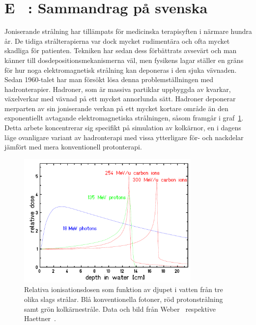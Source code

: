 \section*{\label{sammandragpasvenska}E ~: Sammandrag på svenska}
Joniserande strålning har tillämpats för medicinska terapisyften i närmare hundra år. De tidiga strålterapierna var dock mycket rudimentära och ofta mycket skadliga för patienten. Tekniken har sedan dess förbättrats avsevärt och man känner till dosdepositionsmekanismerna väl, men fysikens lagar ställer en gräns för hur noga elektromagnetisk strålning kan deponeras i den sjuka vävnaden. Sedan 1960-talet har man försökt lösa denna problemställningen med hadronterapier. Hadroner, som är massiva partiklar uppbyggda av kvarkar, växelverkar med vävnad på ett mycket annorlunda sätt. Hadroner deponerar merparten av sin joniserande verkan på ett mycket kortare område än den exponentiellt avtagande elektromagnetiska strålningen, såsom framgår i graf~\ref{fig:DosesFromHaettnerSvenska}. Detta arbete koncentrerar sig specifikt på simulation av kolkärnor, en i dagens läge ovanligare variant av hadronterapi med vissa ytterligare för- och nackdelar jämfört med mera konventionell protonterapi.

\begin{figure}[!h]
\begin{center}
\includegraphics[width=0.8\textwidth]{images/DosesFromHaettner.png}  
\caption{\label{fig:DosesFromHaettnerSvenska}Relativa ionisationsdosen som funktion av djupet i vatten från tre olika slags strålar. Blå konventionella fotoner, röd protonstrålning samt grön kolkärnestråle. Data och bild från Weber~\cite{weber} respektive Haettner~\cite{ehaettner}.} 
\end{center}
\end{figure} 

